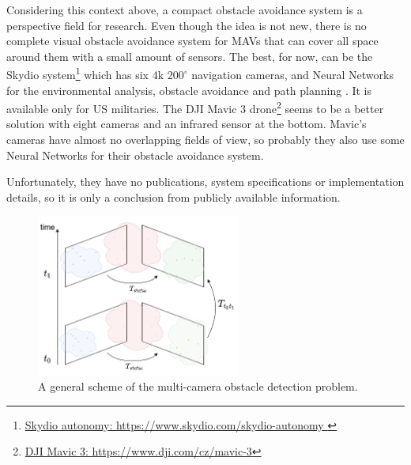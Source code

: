 Considering this context above, a compact obstacle avoidance system is a perspective field for research. 
Even though the idea is not new, there is no complete visual obstacle avoidance system for MAVs that can cover all space around them with a small amount of sensors.
The best, for now, can be the Skydio system\footnote{\href{https://www.skydio.com/skydio-autonomy}{Skydio autonomy: https://www.skydio.com/skydio-autonomy }} which has six 4k $200^\circ$ navigation cameras, and Neural Networks for the environmental analysis, obstacle avoidance and path planning \cite{Skydio}. 
It is available only for US militaries.
The DJI Mavic 3 drone\footnote{\href{https://www.dji.com/cz/mavic-3}{DJI Mavic 3: https://www.dji.com/cz/mavic-3}} seems to be a better solution with eight cameras and an infrared sensor at the bottom. 
Mavic's cameras have almost no overlapping fields of view, so probably they also use some Neural Networks for their obstacle avoidance system. 

Unfortunately, they have no publications, system specifications or implementation details, so it is only a conclusion from publicly available information.

\begin{figure}[t]
    \centering
    \includegraphics[width=0.6\textwidth]{graphics/general_scheme.png}
    \caption{ A general scheme of the multi-camera obstacle detection problem.}
    \label{fig:intro_general}
\end{figure}

